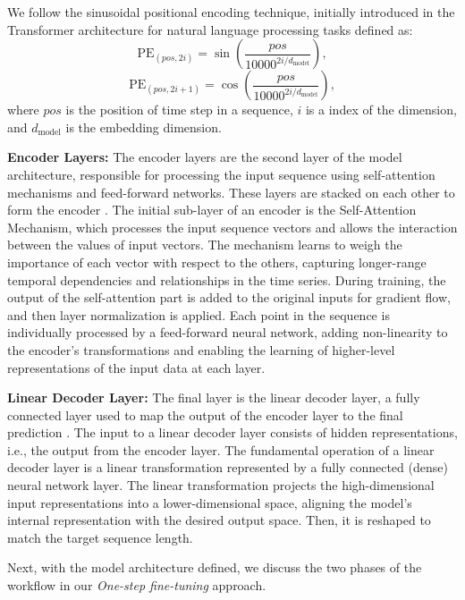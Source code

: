 \documentclass[letterpaper]{article} %
\begin{document}
We follow the sinusoidal positional encoding technique, initially introduced in the Transformer architecture for natural language processing tasks \cite{vaswani2017attention} defined as:
\begin{equation}
\text{PE}_{(pos, 2i)} = \sin\left(\frac{pos}{10000^{2i / d_{\text{model}}}} \right),
\end{equation}
\begin{equation}
\text{PE}_{(pos, 2i + 1)} = \cos\left(\frac{pos}{10000^{2i / d_{\text{model}}}} \right),
\end{equation}
where $pos$ is the position of time step in a sequence, $i$ is a index of the dimension, and $d_{\text{model}}$ is the embedding dimension.

\textbf{Encoder Layers:} The encoder layers are the second layer of the model architecture, responsible for processing the input sequence using self-attention mechanisms and feed-forward networks. These layers are stacked on each other to form the encoder \cite{zhou2021informer}. The initial sub-layer of an encoder is the Self-Attention Mechanism, which processes the input sequence vectors and allows the interaction between the values of input vectors. The mechanism learns to weigh the importance of each vector with respect to the others, capturing longer-range temporal dependencies and relationships in the time series. During training, the output of the self-attention part is added to the original inputs for gradient flow, and then layer normalization is applied. Each point in the sequence is individually processed by a feed-forward neural network, adding non-linearity to the encoder's transformations and enabling the learning of higher-level representations of the input data at each layer.

\textbf{Linear Decoder Layer:} The final layer is the linear decoder layer, a fully connected layer used to map the output of the encoder layer to the final prediction \cite{vaswani2017attention}. The input to a linear decoder layer consists of hidden representations, i.e., the output from the encoder layer. The fundamental operation of a linear decoder layer is a linear transformation represented by a fully connected (dense) neural network layer. The linear transformation projects the high-dimensional input representations into a lower-dimensional space, aligning the model's internal representation with the desired output space. Then, it is reshaped to match the target sequence length.

Next, with the model architecture defined, we discuss the two phases of the workflow in our \emph{One-step fine-tuning} approach.
\end{document}
